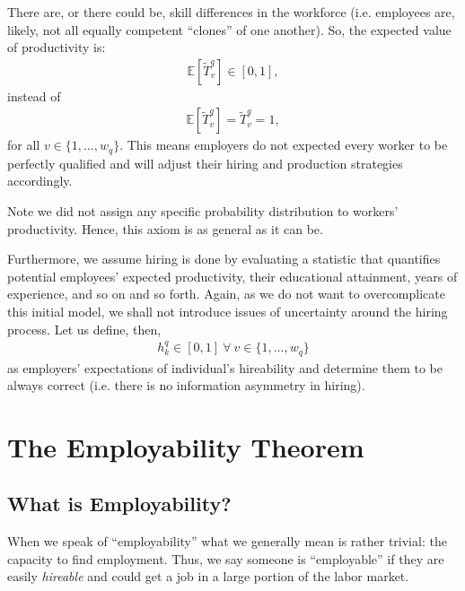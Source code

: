 \documentclass[hidelinks, nonatbib]{elsarticle}
\begin{document}
\begin{axiom}
    There are, or there could be, skill differences in the workforce (i.e. employees are, likely, not all equally competent ``clones'' of one another). So, the expected value of productivity is:
    \begin{gather}
        \mathbb{E}[
            \tilde{T}_{v}^{q}
        ]
        \in
        [0,1]
        ,
    \end{gather}
    instead of 
    \begin{gather}
        \mathbb{E}[
            \tilde{T}_{v}^{q}
        ]
        =
        \tilde{T}_{v}^{q}
        = 1
        ,
    \end{gather}
    for all $v \in \{1, \dots, w_q\}$. This means employers do not expected every worker to be perfectly qualified and will adjust their hiring and production strategies accordingly.
\end{axiom}
Note we did not assign any specific probability distribution to workers' productivity. Hence, this axiom is as general as it can be.
\begin{axiom}
    \label{ha}
    Furthermore, we assume hiring is done by evaluating a statistic that quantifies potential employees' expected productivity, their educational attainment, years of experience, and so on and so forth. Again, as we do not want to overcomplicate this initial model, we shall not introduce issues of uncertainty around the hiring process. Let us define, then,
    \begin{gather}
        h_{k}^{q}
        \in
        [0,1]
        \
        \forall
        \
        v \in \{1, \dots, w_q\}
    \end{gather}
    as employers' expectations of individual's hireability and determine them to be always correct (i.e. there is no information asymmetry in hiring).
\end{axiom}

\section{The Employability Theorem}
\subsection{What is Employability?}
When we speak of ``employability'' what we generally mean is rather trivial: the capacity to find employment. Thus, we say someone is ``employable'' if they are easily \textit{hireable} and could get a job in a large portion of the labor market.
\end{document}
